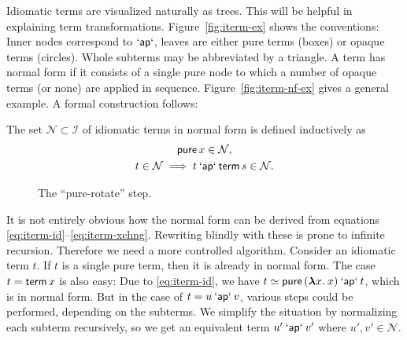 Idiomatic terms are visualized naturally as trees.
This will be helpful in explaining term transformations.
Figure~\ref{fig:iterm-ex} shows the conventions:
Inner nodes correspond to $\mathbin{\mathsf{`ap`}}$, leaves are either pure terms (boxes) or
opaque terms (circles).
Whole subterms may be abbreviated by a triangle.
A term has normal form if it consists of a single pure node to which a number
of opaque terms (or none) are applied in sequence.
Figure~\ref{fig:iterm-nf-ex} gives a general example.
A formal construction follows:

\begin{definition}
The set $\mathcal{N} \subset \mathcal{I}$ of idiomatic terms in normal form is
defined inductively as
\begin{gather}
	\operatorname{\mathsf{pure}} x \in \mathcal{N}, \label{eq:nf-base}\\
	t \in \mathcal{N} \implies t \mathbin{\mathsf{`ap`}} \operatorname{\mathsf{term}} s \in \mathcal{N}. \label{eq:nf-step}
\end{gather}
\end{definition}

\begin{figure}\centering
{}
\raisebox{10mm}{$\qquad\simeq\qquad$}
\raisebox{10mm}{$\qquad\simeq\qquad$}
\caption{The ``pure-rotate'' step.}
\label{fig:pure-rotate}
\end{figure}

It is not entirely obvious how the normal form can be derived from equations
\eqref{eq:iterm-id}--\eqref{eq:iterm-xchng}.
Rewriting blindly with these is prone to infinite recursion.
Therefore we need a more controlled algorithm.
Consider an idiomatic term $t$.
If $t$ is a single pure term, then it is already in normal form.
The case $t = \operatorname{\mathsf{term}} x$ is also easy:
Due to \eqref{eq:iterm-id}, we have $t \simeq \operatorname{\mathsf{pure}}{({\boldsymbol\lambda} x.\>x)} \mathbin{\mathsf{`ap`}} t$,
which is in normal form.
But in the case of $t = u \mathbin{\mathsf{`ap`}} v$, various steps could be performed,
depending on the subterms.
We simplify the situation by normalizing each subterm recursively, so we get
an equivalent term $u' \mathbin{\mathsf{`ap`}} v'$ where $u',v' \in \mathcal{N}$.

